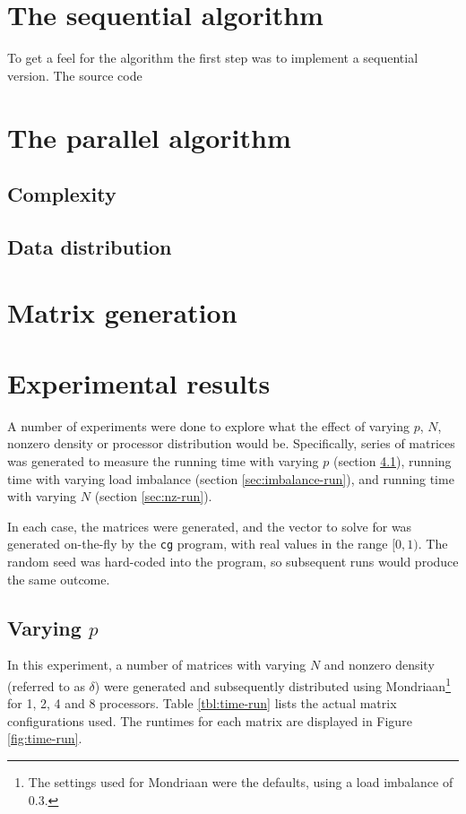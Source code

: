 \documentclass[a4paper]{article}
\begin{document}
\section{The sequential algorithm}

To get a feel for the algorithm the first step was to implement a sequential version. The source code 

\section{The parallel algorithm}

\subsection{Complexity}

\subsection{Data distribution}

\section{Matrix generation}


\section{Experimental results}

A number of experiments were done to explore what the effect of varying $p$,
$N$, nonzero density or processor distribution would be. Specifically, series
of matrices was generated to measure the running time with varying $p$ (section
\ref{sec:time-run}), running time with varying load imbalance (section
\ref{sec:imbalance-run}), and running time with varying $N$ (section
\ref{sec:nz-run}).

In each case, the matrices were generated, and the vector to solve for
was generated on-the-fly by the \texttt{cg} program, with real values
in the range $[0,1)$. The random seed was hard-coded into the program,
    so subsequent runs would produce the same outcome.

\subsection{Varying $p$}\label{sec:time-run}

In this experiment, a number of matrices with varying $N$ and nonzero density (referred to as $\delta$) were generated and
subsequently distributed using Mondriaan\footnote{The settings used for Mondriaan
were the defaults, using a load imbalance of 0.3.} for 1, 2, 4 and 8 processors. Table \ref{tbl:time-run} lists the actual matrix configurations used. The runtimes for each matrix are displayed in Figure \ref{fig:time-run}.
\end{document}
